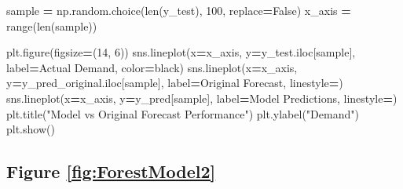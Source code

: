 \documentclass[mstat,12pt]{unswthesis}
\newenvironment{Shaded}{\begin{snugshade}}{\end{snugshade}}
\newcommand{\BuiltInTok}[1]{#1}
\newcommand{\DecValTok}[1]{\textcolor[rgb]{0.00,0.00,0.81}{#1}}
\newcommand{\NormalTok}[1]{#1}
\newcommand{\OperatorTok}[1]{\textcolor[rgb]{0.81,0.36,0.00}{\textbf{#1}}}
\newcommand{\StringTok}[1]{\textcolor[rgb]{0.31,0.60,0.02}{#1}}
\newcommand{\VariableTok}[1]{\textcolor[rgb]{0.00,0.00,0.00}{#1}}
\begin{document}
\begin{Shaded}
\begin{Highlighting}[]
\NormalTok{sample }\OperatorTok{=}\NormalTok{ np.random.choice(}\BuiltInTok{len}\NormalTok{(y\_test), }\DecValTok{100}\NormalTok{, replace}\OperatorTok{=}\VariableTok{False}\NormalTok{)}
\NormalTok{x\_axis }\OperatorTok{=} \BuiltInTok{range}\NormalTok{(}\BuiltInTok{len}\NormalTok{(sample))}

\NormalTok{plt.figure(figsize}\OperatorTok{=}\NormalTok{(}\DecValTok{14}\NormalTok{, }\DecValTok{6}\NormalTok{))}
\NormalTok{sns.lineplot(x}\OperatorTok{=}\NormalTok{x\_axis, y}\OperatorTok{=}\NormalTok{y\_test.iloc[sample], }
\NormalTok{    label}\OperatorTok{=}\StringTok{\textquotesingle{}Actual Demand\textquotesingle{}}\NormalTok{, color}\OperatorTok{=}\StringTok{\textquotesingle{}black\textquotesingle{}}\NormalTok{)}
\NormalTok{sns.lineplot(x}\OperatorTok{=}\NormalTok{x\_axis, y}\OperatorTok{=}\NormalTok{y\_pred\_original.iloc[sample], }
\NormalTok{    label}\OperatorTok{=}\StringTok{\textquotesingle{}Original Forecast\textquotesingle{}}\NormalTok{, linestyle}\OperatorTok{=}\StringTok{\textquotesingle{}{-}{-}\textquotesingle{}}\NormalTok{)}
\NormalTok{sns.lineplot(x}\OperatorTok{=}\NormalTok{x\_axis, y}\OperatorTok{=}\NormalTok{y\_pred[sample], }
\NormalTok{    label}\OperatorTok{=}\StringTok{\textquotesingle{}Model Predictions\textquotesingle{}}\NormalTok{, linestyle}\OperatorTok{=}\StringTok{\textquotesingle{}{-}{-}\textquotesingle{}}\NormalTok{)}
\NormalTok{plt.title(}\StringTok{"Model vs Original Forecast Performance"}\NormalTok{)}
\NormalTok{plt.ylabel(}\StringTok{"Demand"}\NormalTok{)}
\NormalTok{plt.show()}
\end{Highlighting}
\end{Shaded}

\subsection*{Figure \ref{fig:ForestModel2}}\label{figure-reffigforestmodel2}
\end{document}
